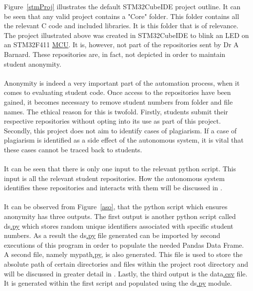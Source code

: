 Figure~\ref{stmProj} illustrates the default STM32CubeIDE project outline. It can be seen that any valid project contains a "Core" folder. This folder contains all the relevant C code and included libraries. It is this folder that is of relevance. The project illustrated above was created in STM32CubeIDE to blink an LED on an STM32F411 \hyperref[listAbr]{MCU}. It is, however, not part of the repositories sent by Dr A Barnard. These repositories are, in fact, not depicted in order to maintain student anonymity. 
\\\\
Anonymity is indeed a very important part of the automation process, when it comes to evaluating student code. Once access to the repositories have been gained, it becomes necessary to remove student numbers from folder and file names. The ethical reason for this is twofold. Firstly, students submit their respective repositories without opting into its use as part of this project. Secondly, this project does not aim to identify cases of plagiarism. If a case of plagiarism is identified as a side effect of the autonomous system, it is vital that these cases cannot be traced back to students.
\\\\
It can be seen that there is only one input to the relevant python script. This input is all the relevant student repositories. How the autonomous system identifies these repositories and interacts with them will be discussed in \textbf{}.
\\\\
It can be observed from Figure~\ref{aso}, that the python script which ensures anonymity has three outputs. The first output is another python script called ds\hyperref[listExt]{.py} which stores random unique identifiers associated with specific student numbers. As a result the ds\hyperref[listExt]{.py} file generated can be imported by second executions of this program in order to populate the needed Pandas Data Frame. A second file, namely mypath\hyperref[listExt]{.py}, is also generated. This file is used to store the absolute path of certain directories and files within the project root directory and will be discussed in greater detail in \textbf{}. Lastly, the third output is the data\hyperref[listExt]{.csv} file. It is generated within the first script and populated using the ds\hyperref[listExt]{.py} module.

